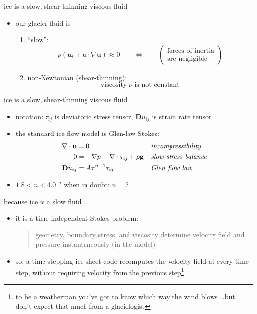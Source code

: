 \documentclass{beamer}
\begin{document}
\begin{frame}{ice is a slow, shear-thinning viscous fluid}

\begin{itemize}
\item our glacier fluid is
  \begin{enumerate}
  \item ``slow'':
    $$\rho \left(\mathbf{u}_t + \mathbf{u}\cdot\nabla \mathbf{u}\right) \approx 0 \qquad \iff \qquad \begin{pmatrix} \text{forces of inertia} \\ \text{are negligible} \end{pmatrix}$$
  \item non-Newtonian (shear-thinning):
    $$\text{viscosity $\nu$ is not constant}$$
  \end{enumerate}
\end{itemize}
\end{frame}


\begin{frame}{ice is a slow, shear-thinning viscous fluid}

\begin{itemize}
\item notation: $\tau_{ij}$ is deviatoric stress tensor, $\mathbf{D}u_{ij}$ is strain rate tensor
\item the standard ice flow model is Glen-law Stokes:
\begin{align*}
\nabla \cdot \mathbf{u} &= 0 &&\text{\emph{incompressibility}} \\
0 &= - \nabla p + \nabla \cdot \tau_{ij} + \rho \mathbf{g} &&\text{\emph{slow stress balance}} \\
\mathbf{D}u_{ij} &= A \tau^{n-1} \tau_{ij} &&\text{\emph{Glen flow law}}
\end{align*}
\item $1.8 < n < 4.0$ ?  \quad when in doubt: $n=3$
\end{itemize}
\end{frame}


\begin{frame}{because ice is a slow fluid \dots}

\begin{itemize}
\item it is a time-independent Stokes problem:
  \begin{quote}
  \alert{geometry, boundary stress, and viscosity determine velocity field and pressure instantaneously} (in the model)
  \end{quote}
\item so: a time-stepping ice sheet code recomputes the velocity field at every time step, without requiring velocity from the previous step\footnote{to be a weatherman you've got to know which way the wind blows \dots but don't expect that much from a glaciologist}
\end{itemize}
\end{frame}
\end{document}
